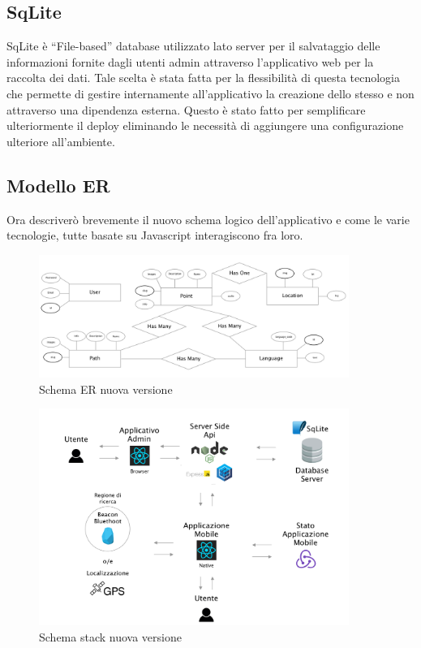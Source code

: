 \subsection{SqLite}\vspace{5mm}

	SqLite è “File-based” database utilizzato lato server per il salvataggio delle informazioni fornite dagli utenti admin attraverso l’applicativo web per la raccolta dei dati. Tale scelta è stata fatta per la flessibilità di questa tecnologia che permette di gestire internamente all’applicativo la creazione dello stesso e non attraverso una dipendenza esterna. Questo è stato fatto per semplificare ulteriormente il deploy eliminando le necessità di aggiungere una configurazione ulteriore all’ambiente.\vspace{5mm}
	
	\subsection{Modello ER}\vspace{5mm}

Ora descriverò brevemente il nuovo schema logico dell'applicativo e come le varie tecnologie, tutte basate su Javascript interagiscono fra loro.
	
\begin{figure}[h]
\centering
\includegraphics[width=0.9\textwidth]{images/erNew.png}
\caption{Schema ER nuova versione}
\end{figure}
	
	
\begin{figure}[h]
\centering
\includegraphics[width=0.9\textwidth]{images/stackAlakai.png}
\caption{Schema stack nuova versione}
\end{figure}

